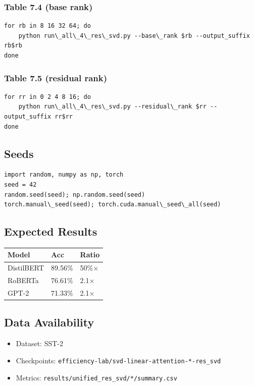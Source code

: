 \subsubsection{Table 7.4 (base rank)}
\begin{lstlisting}
for rb in 8 16 32 64; do
    python run\_all\_4\_res\_svd.py --base\_rank $rb --output_suffix rb$rb
done
\end{lstlisting}

\subsubsection{Table 7.5 (residual rank)}
\begin{lstlisting}
for rr in 0 2 4 8 16; do
    python run\_all\_4\_res\_svd.py --residual\_rank $rr --output_suffix rr$rr
done
\end{lstlisting}

\subsection{Seeds}

\begin{lstlisting}
import random, numpy as np, torch
seed = 42
random.seed(seed); np.random.seed(seed)
torch.manual\_seed(seed); torch.cuda.manual\_seed\_all(seed)
\end{lstlisting}

\subsection{Expected Results}

\begin{table}[H]
\centering
\small
\begin{tabular}{lll}
\toprule
\textbf{Model} & \textbf{Acc} & \textbf{Ratio} \\
\midrule
DistilBERT & 89.56\% & 50\%$\times$ \\
RoBERTa & 76.61\% & 2.1$\times$ \\
GPT-2 & 71.33\% & 2.1$\times$ \\
\bottomrule
\end{tabular}
\end{table}

\subsection{Data Availability}

\begin{itemize}
\item Dataset: SST-2
\item Checkpoints: \texttt{efficiency-lab/svd-linear-attention-*-res\_svd}
\item Metrics: \texttt{results/unified\_res\_svd/*/summary.csv}

\end{itemize}
